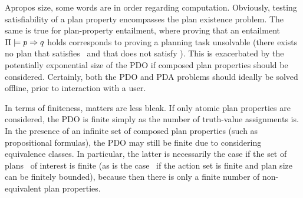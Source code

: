 %
%
Apropos size, some words are in order regarding
computation. Obviously, testing satisfiability of a plan property
encompasses the plan existence problem. The same is true for
plan-property entailment, where proving that an entailment
$\Pi \models p \Rightarrow q$ holds corresponds to proving a
planning task unsolvable (there exists no plan that satisfies
\prop\ and that does not satisfy \propq). This is exacerbated by the
potentially exponential size of the PDO if composed plan properties
should be considered. Certainly, both the PDO and PDA problems should
ideally be solved offline, prior to interaction with a user. 

In terms of finiteness, matters are less bleak. If only atomic plan
properties are considered, the PDO is finite simply as the number of
truth-value assignments is. In the presence of an infinite set of
composed plan properties (such as propositional formulas), the PDO may
still be finite due to considering equivalence classes. In particular,
the latter is necessarily the case if the set of plans \plans\ of
interest is finite (as is the case \eg\ if the action set is finite
and plan size can be finitely bounded), because then there is only a
finite number of non-equivalent plan properties.








